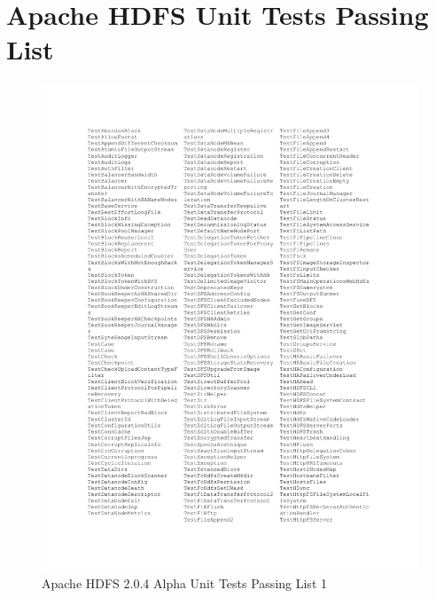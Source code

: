 
%
%


\chapter{Apache HDFS Unit Tests Passing List}
\label{ch:Testing}
%
\begin{figure}[ht]
  \centering
  \includegraphics[width=\linewidth]{figs/unitTest1.pdf}
  \caption{Apache HDFS 2.0.4 Alpha Unit Tests Passing List 1}
  \label{fig:unit1}
\end{figure}
